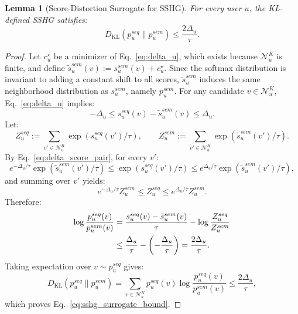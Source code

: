 ﻿\documentclass{article}
\newtheorem{lemma}{Lemma}[section]
\begin{document}
\begin{lemma}[Score-Distortion Surrogate for SSHG]
\label{lem:sshg_surrogate}
For every user $u$, the KL-defined SSHG satisfies:
\begin{equation}
D_{\mathrm{KL}}(p_u^{seq}\|p_u^{sem})
\le
\frac{2\Delta_u}{\tau}.
\label{eq:sshg_surrogate_bound}
\end{equation}
\end{lemma}

\begin{proof}
Let $c_u^\star$ be a minimizer of Eq.~\eqref{eq:delta_u}, which exists because $\mathcal N_u^K$ is finite, and define $\tilde{s}_u^{sem}(v):=s_u^{sem}(v)+c_u^\star$. Since the softmax distribution is invariant to adding a constant shift to all scores, $\tilde{s}_u^{sem}$ induces the same neighborhood distribution as $s_u^{sem}$, namely $p_u^{sem}$. For any candidate $v\in\mathcal N_u^K$, Eq.~\eqref{eq:delta_u} implies:
\begin{equation}
-\Delta_u
\le
s_u^{seq}(v)-\tilde{s}_u^{sem}(v)
\le
\Delta_u.
\label{eq:delta_score_pair}
\end{equation}
Let:
\begin{equation}
Z_u^{seq}:=\sum_{v'\in\mathcal N_u^K}\exp(s_u^{seq}(v')/\tau),
\qquad
Z_u^{sem}:=\sum_{v'\in\mathcal N_u^K}\exp(\tilde{s}_u^{sem}(v')/\tau).
\end{equation}
By Eq.~\eqref{eq:delta_score_pair}, for every $v'$:
\begin{equation}
e^{-\Delta_u/\tau}\exp(\tilde{s}_u^{sem}(v')/\tau)
\le
\exp(s_u^{seq}(v')/\tau)
\le
e^{\Delta_u/\tau}\exp(\tilde{s}_u^{sem}(v')/\tau),
\end{equation}
and summing over $v'$ yields:
\begin{equation}
e^{-\Delta_u/\tau}Z_u^{sem}
\le
Z_u^{seq}
\le
e^{\Delta_u/\tau}Z_u^{sem}.
\label{eq:delta_partition}
\end{equation}
Therefore:
\begin{align}
\log\frac{p_u^{seq}(v)}{p_u^{sem}(v)}
&= 
\frac{s_u^{seq}(v)-\tilde{s}_u^{sem}(v)}{\tau}
-
\log\frac{Z_u^{seq}}{Z_u^{sem}} \notag\\
&\le
\frac{\Delta_u}{\tau}
-
\left(-\frac{\Delta_u}{\tau}\right)
=
\frac{2\Delta_u}{\tau}.
\end{align}
Taking expectation over $v\sim p_u^{seq}$ gives:
\begin{equation}
D_{\mathrm{KL}}(p_u^{seq}\|p_u^{sem})
=
\sum_{v\in\mathcal N_u^K}p_u^{seq}(v)\log\frac{p_u^{seq}(v)}{p_u^{sem}(v)}
\le
\frac{2\Delta_u}{\tau},
\end{equation}
which proves Eq.~\eqref{eq:sshg_surrogate_bound}.
\end{proof}
\end{document}
